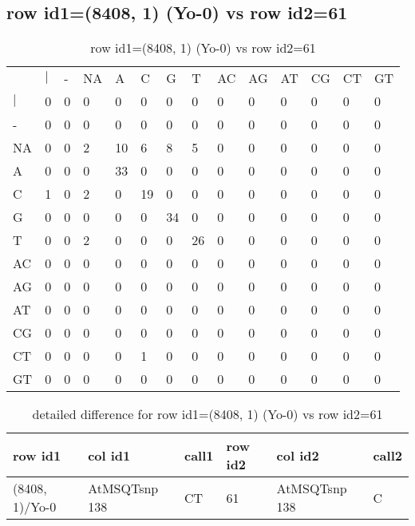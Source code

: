 \subsection{row id1=(8408, 1) (Yo-0) vs row id2=61}
\begin{center}
\begin{longtable}{|l|l|l|l|l|l|l|l|l|l|l|l|l|l|}
\caption{row id1=(8408, 1) (Yo-0) vs row id2=61} \label{table_dm678}\\
\hline
\\
\hline
&$|$&-&NA&A&C&G&T&AC&AG&AT&CG&CT&GT\\
$|$&0&0&0&0&0&0&0&0&0&0&0&0&0\\
-&0&0&0&0&0&0&0&0&0&0&0&0&0\\
NA&0&0&2&10&6&8&5&0&0&0&0&0&0\\
A&0&0&0&33&0&0&0&0&0&0&0&0&0\\
C&1&0&2&0&19&0&0&0&0&0&0&0&0\\
G&0&0&0&0&0&34&0&0&0&0&0&0&0\\
T&0&0&2&0&0&0&26&0&0&0&0&0&0\\
AC&0&0&0&0&0&0&0&0&0&0&0&0&0\\
AG&0&0&0&0&0&0&0&0&0&0&0&0&0\\
AT&0&0&0&0&0&0&0&0&0&0&0&0&0\\
CG&0&0&0&0&0&0&0&0&0&0&0&0&0\\
CT&0&0&0&0&1&0&0&0&0&0&0&0&0\\
GT&0&0&0&0&0&0&0&0&0&0&0&0&0\\
\hline
\end{longtable}
\end{center}

\begin{center}
\begin{longtable}{|l|l|l|l|l|l|}
\caption{detailed difference for row id1=(8408, 1) (Yo-0) vs row id2=61} \label{table_dm679}\\
\hline
row id1&col id1&call1&row id2&col id2&call2\\
\hline
(8408, 1)/Yo-0&AtMSQTsnp 138&CT&61&AtMSQTsnp 138&C\\
\hline
\end{longtable}
\end{center}

